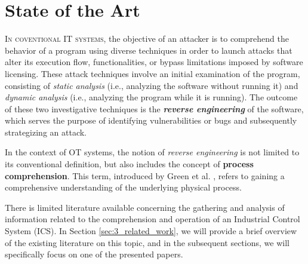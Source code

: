 \chapter{State of the Art}
\label{state_of_art}
\linenumbers

\lettrine[lines=2]{I}{n coventional IT systems}, the objective of an attacker is to comprehend the behavior of a program using diverse techniques in order to launch attacks that alter its execution flow, functionalities, or bypass limitations imposed by software licensing. These attack techniques involve an initial examination of the program, consisting of \textit{static analysis} (i.e., analyzing the software without running it) and \textit{dynamic analysis} (i.e., analyzing the program while it is running).\newline 
The outcome of these two investigative techniques is the \textit{\textbf{reverse engineering}} of the software, which serves the purpose of identifying vulnerabilities or bugs and subsequently strategizing an attack.

\bigskip
In the context of OT systems, the notion of \textit{reverse engineering} is not limited to its conventional definition, but also includes the concept of \textbf{process comprehension}. This term, introduced by Green et al. \cite{green_et_al}, refers to gaining a comprehensive understanding of the underlying physical process.

\bigskip
There is limited literature available concerning the gathering and analysis of information related to the comprehension and operation of an Industrial Control System (ICS). In Section \ref{sec:3_related_work}, we will provide a brief overview of the existing literature on this topic, and in the subsequent sections, we will specifically focus on one of the presented papers.

\vfill

